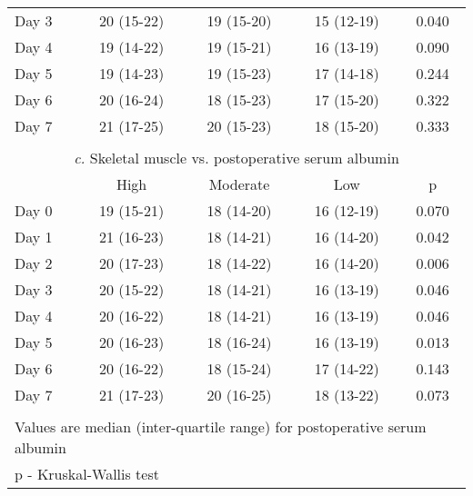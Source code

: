 \begin{table}[p]
\begin{tabular}{|l c c c c |}
		Day 3 & 20 (15-22) & 19 (15-20) & 15 (12-19) & 0.040                                         \\
		Day 4 & 19 (14-22) & 19 (15-21) & 16 (13-19) & 0.090                                         \\
		Day 5 & 19 (14-23) & 19 (15-23) & 17 (14-18) & 0.244                                         \\
		Day 6 & 20 (16-24) & 18 (15-23) & 17 (15-20) & 0.322                                         \\
		Day 7 & 21 (17-25) & 20 (15-23) & 18 (15-20) & 0.333                                         \\ \hline
		                                    \multicolumn{5}{c}{}                                     \\
		      \multicolumn{5}{c}{\textit{c.} Skeletal muscle vs. postoperative serum albumin}        \\ \hline
		      & High       & Moderate   & Low        & p                                             \\
		Day 0 & 19 (15-21) & 18 (14-20) & 16 (12-19) & 0.070                                         \\
		Day 1 & 21 (16-23) & 18 (14-21) & 16 (14-20) & 0.042                                         \\
		Day 2 & 20 (17-23) & 18 (14-22) & 16 (14-20) & 0.006                                         \\
		Day 3 & 20 (15-22) & 18 (14-21) & 16 (13-19) & 0.046                                         \\
		Day 4 & 20 (16-22) & 18 (14-21) & 16 (13-19) & 0.046                                         \\
		Day 5 & 20 (16-23) & 18 (16-24) & 16 (13-19) & 0.013                                         \\
		Day 6 & 20 (16-22) & 18 (15-24) & 17 (14-22) & 0.143                                         \\
		Day 7 & 21 (17-23) & 20 (16-25) & 18 (13-22) & 0.073                                         \\ \hline
		                                    \multicolumn{5}{c}{}                                     \\
		\multicolumn{5}{l}{Values are median (inter-quartile range) for postoperative serum albumin} \\
		\multicolumn{5}{l}{p - Kruskal-Wallis test}
	\end{tabular}	
\end{table}

		  